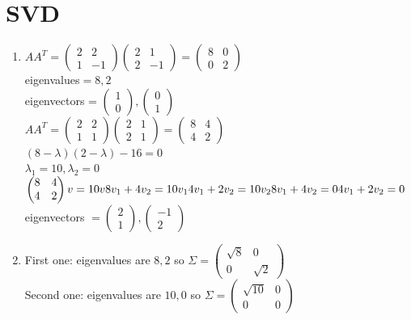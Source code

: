 \documentclass[11pt]{article}
\begin{document}
\section{SVD}
\begin{enumerate}
\item
$AA^T=\begin{pmatrix} 2 & 2 \\ 1 & -1 \end{pmatrix} \begin{pmatrix} 2 & 1 \\ 2 & -1 \end{pmatrix} = \begin{pmatrix} 8&0 \\ 0&2 \end{pmatrix}$\\
eigenvalues$=8,2$\\
eigenvectors = $\begin{pmatrix} 1 \\ 0\end{pmatrix}, \begin{pmatrix} 0 \\ 1\end{pmatrix}$\\
$AA^T=\begin{pmatrix} 2 & 2 \\ 1 & 1 \end{pmatrix} \begin{pmatrix} 2 & 1 \\ 2 & 1 \end{pmatrix} = \begin{pmatrix} 8&4 \\ 4&2 \end{pmatrix}$\\
$(8-\lambda)(2-\lambda)-16=0$\\
$\lambda_1 = 10, \lambda_2 = 0$\\
$\begin{pmatrix} 8 & 4 \\ 4 & 2 \end{pmatrix}v = 10v \\
8v_1 + 4v_2 = 10v_1\\
4v_1 + 2v_2 = 10v_2\\
8v_1 + 4v_2 = 0\\
4v_1 + 2v_2 = 0\\
$eigenvectors $ = \begin{pmatrix} 2 \\ 1\end{pmatrix}, \begin{pmatrix} -1 \\ 2\end{pmatrix}
$
\item
	First one:
	eigenvalues are $8,2$ so $\Sigma=\begin{pmatrix} \sqrt{8}&0\\0&\sqrt{2} \end{pmatrix}$\\
	Second one:
	eigenvalues are $10,0$ so $\Sigma=\begin{pmatrix} \sqrt{10}&0\\0&0 \end{pmatrix}$
	

\end{enumerate}
\end{document}
